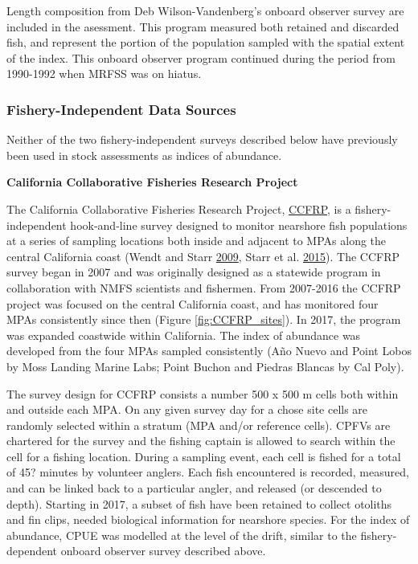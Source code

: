 \documentclass[12pt,]{article}
\begin{document}
Length composition from Deb Wilson-Vandenberg's onboard observer survey
are included in the asessment. This program measured both retained and
discarded fish, and represent the portion of the population sampled with
the spatial extent of the index. This onboard observer program continued
during the period from 1990-1992 when MRFSS was on hiatus.

\subsubsection{Fishery-Independent Data
Sources}\label{fishery-independent-data-sources}

Neither of the two fishery-independent surveys described below have
previously been used in stock assessments as indices of abundance.

\textbf{California Collaborative Fisheries Research Project}

The California Collaborative Fisheries Research Project,
\href{https://www.mlml.calstate.edu/ccfrp/}{CCFRP}, is a
fishery-independent hook-and-line survey designed to monitor nearshore
fish populations at a series of sampling locations both inside and
adjacent to MPAs along the central California coast (Wendt and Starr
\protect\hyperlink{ref-Wendt2009}{2009}, Starr et al.
\protect\hyperlink{ref-Starr2015}{2015}). The CCFRP survey began in 2007
and was originally designed as a statewide program in collaboration with
NMFS scientists and fishermen. From 2007-2016 the CCFRP project was
focused on the central California coast, and has monitored four MPAs
consistently since then (Figure \ref{fig:CCFRP_sites}). In 2017, the
program was expanded coastwide within California. The index of abundance
was developed from the four MPAs sampled consistently (Año Nuevo and
Point Lobos by Moss Landing Marine Labs; Point Buchon and Piedras
Blancas by Cal Poly).

The survey design for CCFRP consists a number 500 x 500 m cells both
within and outside each MPA. On any given survey day for a chose site
cells are randomly selected within a stratum (MPA and/or reference
cells). CPFVs are chartered for the survey and the fishing captain is
allowed to search within the cell for a fishing location. During a
sampling event, each cell is fished for a total of 45? minutes by
volunteer anglers. Each fish encountered is recorded, measured, and can
be linked back to a particular angler, and released (or descended to
depth). Starting in 2017, a subset of fish have been retained to collect
otoliths and fin clips, needed biological information for nearshore
species. For the index of abundance, CPUE was modelled at the level of
the drift, similar to the fishery-dependent onboard observer survey
described above.
\end{document}

